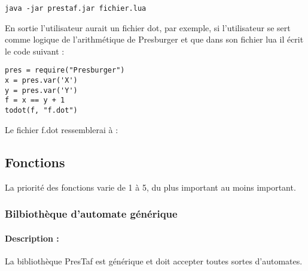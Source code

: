 \documentclass{article}%
\begin{document}
\begin{lstlisting}[mathescape=true, frame=single]
java -jar prestaf.jar fichier.lua
\end{lstlisting}

En sortie l'utilisateur aurait un fichier dot, par exemple, si l'utilisateur se sert comme logique de l'arithmétique de Presburger et que dans son fichier lua il écrit le code suivant :

\begin{lstlisting}[mathescape=true, frame=single]
pres = require("Presburger")
x = pres.var('X')
y = pres.var('Y')
f = x == y + 1
todot(f, "f.dot")
\end{lstlisting}

Le fichier f.dot ressemblerai à :


\subsection{Fonctions}

La priorité des fonctions varie de 1 à 5, du plus important au moins important.

\subsubsection{Bilbiothèque d'automate générique}

\paragraph{Description :} La bibliothèque PresTaf est générique et doit accepter toutes sortes d'automates.
\end{document}
